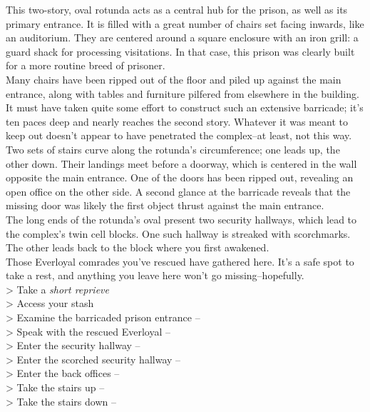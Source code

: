 This two-story, oval rotunda acts as a central hub for the prison, as well as its primary entrance. It is filled with a great number of chairs set facing inwards, like an auditorium. They are centered around a square enclosure with an iron grill: a guard shack for processing visitations. In that case, this prison was clearly built for a more routine breed of prisoner.\\

Many chairs have been ripped out of the floor and piled up against the main entrance, along with tables and furniture pilfered from elsewhere in the building. It must have taken quite some effort to construct such an extensive barricade; it’s ten paces deep and nearly reaches the second story. Whatever it was meant to keep out doesn’t appear to have penetrated the complex--at least, not this way.\\

Two sets of stairs curve along the rotunda’s circumference; one leads up, the other down. Their landings meet before a doorway, which is centered in the wall opposite the main entrance. One of the doors has been ripped out, revealing an open office on the other side. A second glance at the barricade reveals that the missing door was likely the first object thrust against the main entrance.\\

The long ends of the rotunda's oval present two security hallways, which lead to the complex’s twin cell blocks. One such hallway is streaked with scorchmarks. The other leads back to the block where you first awakened.\\

Those Everloyal comrades you’ve rescued have gathered here. It’s a safe spot to take a rest, and anything you leave here won’t go missing--hopefully.\\

> Take a \emph{short reprieve}\\
> Access your stash\\
> Examine the barricaded prison entrance -- \\
> Speak with the rescued Everloyal -- \\
> Enter the security hallway -- \\
> Enter the scorched security hallway -- \\
> Enter the back offices -- \\
> Take the stairs up -- \\
> Take the stairs down -- 